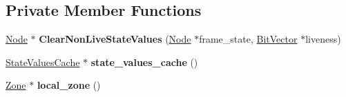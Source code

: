 \subsection*{Private Member Functions}
\begin{DoxyCompactItemize}
\item 
\hyperlink{classv8_1_1internal_1_1compiler_1_1_node}{Node} $\ast$ {\bfseries Clear\+Non\+Live\+State\+Values} (\hyperlink{classv8_1_1internal_1_1compiler_1_1_node}{Node} $\ast$frame\+\_\+state, \hyperlink{classv8_1_1internal_1_1_bit_vector}{Bit\+Vector} $\ast$liveness)\hypertarget{classv8_1_1internal_1_1compiler_1_1_non_live_frame_state_slot_replacer_a532d3996e5df29921a8cdd5ff95c6ff4}{}\label{classv8_1_1internal_1_1compiler_1_1_non_live_frame_state_slot_replacer_a532d3996e5df29921a8cdd5ff95c6ff4}

\item 
\hyperlink{classv8_1_1internal_1_1compiler_1_1_state_values_cache}{State\+Values\+Cache} $\ast$ {\bfseries state\+\_\+values\+\_\+cache} ()\hypertarget{classv8_1_1internal_1_1compiler_1_1_non_live_frame_state_slot_replacer_a2ac46e67dd3ba641b7702b435858c346}{}\label{classv8_1_1internal_1_1compiler_1_1_non_live_frame_state_slot_replacer_a2ac46e67dd3ba641b7702b435858c346}

\item 
\hyperlink{classv8_1_1internal_1_1_zone}{Zone} $\ast$ {\bfseries local\+\_\+zone} ()\hypertarget{classv8_1_1internal_1_1compiler_1_1_non_live_frame_state_slot_replacer_add4de025f5160164860959090c2cf3fa}{}\label{classv8_1_1internal_1_1compiler_1_1_non_live_frame_state_slot_replacer_add4de025f5160164860959090c2cf3fa}

\end{DoxyCompactItemize}
